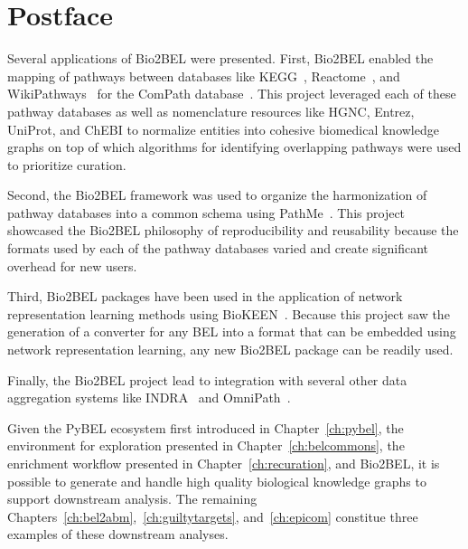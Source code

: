 \section*{Postface}

Several applications of Bio2BEL were presented.
First, Bio2BEL enabled the mapping of pathways between databases like \ac{KEGG}~\cite{Kanehisa2017}, Reactome~\cite{Fabregat2016}, and WikiPathways~\cite{Slenter2018} for the ComPath database~\cite{Domingo-Fernandez2018}.
This project leveraged each of these pathway databases as well as nomenclature resources like HGNC, Entrez, UniProt, and ChEBI to normalize entities into cohesive biomedical knowledge graphs on top of which algorithms for identifying overlapping pathways were used to prioritize curation.

Second, the Bio2BEL framework was used to organize the harmonization of pathway databases into a common schema using PathMe~\cite{Domingo-Fernandez2019a}.
This project showcased the Bio2BEL philosophy of reproducibility and reusability because the formats used by each of the pathway databases varied and create significant overhead for new users.

Third, Bio2BEL packages have been used in the application of network representation learning methods using BioKEEN~\cite{Ali2019}.
Because this project saw the generation of a converter for any \ac{BEL} into a format that can be embedded using network representation learning, any new Bio2BEL package can be readily used.

Finally, the Bio2BEL project lead to integration with several other data aggregation systems like \ac{INDRA}~\cite{Gyori2017} and OmniPath~\cite{Turei2016}.

Given the PyBEL ecosystem first introduced in Chapter~\ref{ch:pybel}, the environment for exploration presented in Chapter~\ref{ch:belcommons}, the enrichment workflow presented in Chapter~\ref{ch:recuration}, and Bio2BEL, it is possible to generate and handle high quality biological knowledge graphs to support downstream analysis.
The remaining Chapters~\ref{ch:bel2abm},~\ref{ch:guiltytargets}, and~\ref{ch:epicom} constitue three examples of these downstream analyses.
